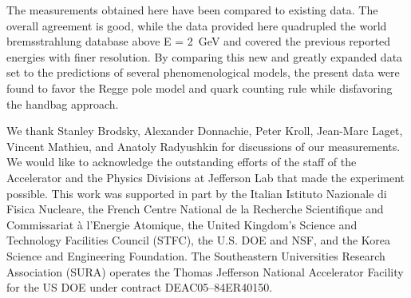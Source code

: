 \documentclass[aps,prc,twocolumn,floatfix,showpacs,preprintnumbers,amsmath,amssymb,superscriptaddress]{revtex4-1}
\begin{document}
The measurements obtained here have been compared to
existing data. The overall agreement is good, while the 
data provided here quadrupled the world bremsstrahlung 
database above E = 2~GeV and covered the previous reported energies with finer 
resolution. By comparing this new and greatly expanded data 
set to the predictions of several phenomenological models, 
the present data were found to favor the Regge pole model 
and quark counting rule while disfavoring the 
handbag approach.  

\FloatBarrier
We thank Stanley Brodsky, Alexander Donnachie, 
Peter Kroll, Jean-Marc Laget, Vincent Mathieu, 
and Anatoly Radyushkin for discussions of our 
measurements. We would like to acknowledge the outstanding 
efforts of the staff of the Accelerator and the Physics 
Divisions at Jefferson Lab that made the experiment possible.  
This work was supported in part by the Italian Istituto 
Nazionale di Fisica Nucleare, the French Centre National de 
la Recherche Scientifique and Commissariat \`a l'Energie 
Atomique, the United Kingdom's Science and Technology 
Facilities Council (STFC), the U.S. DOE and NSF, and the 
Korea Science and Engineering Foundation. The Southeastern 
Universities Research Association (SURA) operates the Thomas 
Jefferson National Accelerator Facility for the US DOE under 
contract DEAC05--84ER40150.
\end{document}
